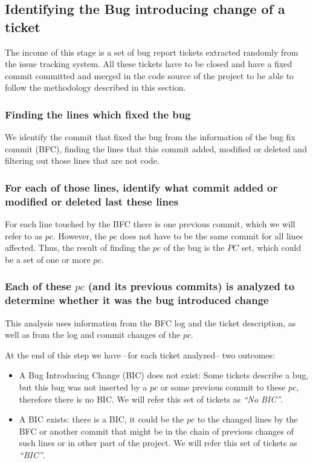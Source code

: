 \documentclass[conference]{IEEEtran}
\begin{document}
\subsection{Identifying the Bug introducing change of a ticket}
\label{sec:methodologySS}

The income of this stage is a set of bug report tickets extracted randomly from the issue tracking system.
All these tickets have to be closed and have a fixed commit committed and merged in the code source of the project to be able to follow the methodology described in this section.

\subsubsection{Finding the lines which fixed the bug}

We identify the commit that fixed the bug from the information of the bug fix commit (BFC), finding the lines that this commit added, modified or deleted and filtering out those lines that are not code.
	
\subsubsection{For each of those lines, identify what commit added or modified or deleted last these lines}

For each line touched by the BFC there is one previous commit, which we will refer to as $pc$.
However, the $pc$ does not have to be the same commit for all lines affected.
Thus, the result of finding the $pc$ of the bug is the $PC$ set, which could be a set of one or more $pc$. 

\subsubsection{Each of these $pc$ (and its previous commits) is analyzed to determine whether it was the bug introduced change}

This analysis uses information from the BFC log and the ticket description, as well as from the log and commit changes of the $pc$.

At the end of this step we have --for each ticket analyzed-- two outcomes:
\begin{itemize}
	\item A Bug Introducing Change (BIC) does not exist: Some tickets describe a bug, but this bug was not inserted by a $pc$ or some previous commit to these $pc$, therefore there is no BIC. We will refer this set of tickets as \textit{``No BIC''}.
	\item A BIC exists: there is a BIC, it could be the $pc$ to the changed lines by the BFC or another commit that might be in the chain of previous changes of such lines or in other part of the project. We will refer this set of tickets as \textit{``BIC''}. 
\end{itemize}
\end{document}
